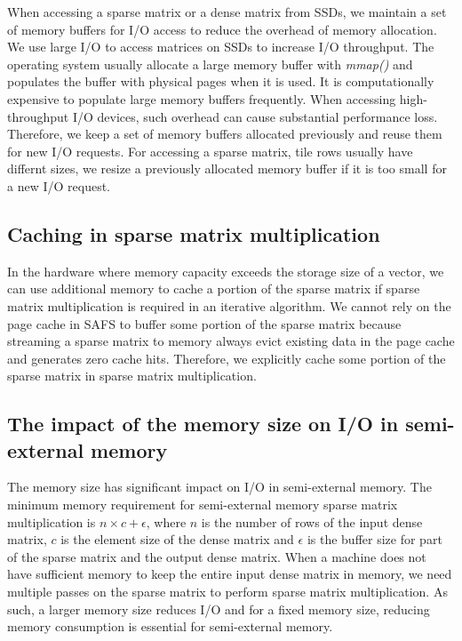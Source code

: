 When accessing a sparse matrix or a dense matrix from SSDs, we maintain a set of
memory buffers for I/O access to reduce the overhead of memory allocation.
We use large I/O to access matrices on SSDs to increase I/O throughput.
The operating system usually allocate a large memory buffer with \textit{mmap()}
and populates the buffer with physical pages when it is used. It is
computationally expensive to populate
large memory buffers frequently. When accessing high-throughput I/O devices,
such overhead can cause substantial performance loss. Therefore, we keep a set
of memory buffers allocated previously and reuse them for new I/O requests.
For accessing a sparse matrix, tile rows usually have differnt sizes, we resize
a previously allocated memory buffer if it is too small for a new I/O request.

\subsection{Caching in sparse matrix multiplication} \label{sec:cache}
In the hardware where memory capacity exceeds the storage size of a vector, we
can use additional memory to cache a portion of the sparse matrix if sparse matrix
multiplication is required in an iterative algorithm. We cannot rely on
the page cache in SAFS \cite{sa-cache} to buffer some portion of the sparse matrix
because streaming a sparse matrix to memory always evict existing data in the page
cache and generates zero cache hits. Therefore, we explicitly cache some portion
of the sparse matrix in sparse matrix multiplication. 

\subsection{The impact of the memory size on I/O in semi-external memory}
\label{sec:mem}
The memory size has significant impact on I/O in semi-external memory.
The minimum memory requirement for semi-external memory sparse matrix
multiplication is $n \times c + \epsilon$, where $n$ is the number of rows
of the input dense matrix, $c$ is the element size of the dense matrix
and $\epsilon$ is the buffer size for part of the sparse matrix and the output
dense matrix. When a machine does not have sufficient memory to keep the entire
input dense matrix in memory, we need multiple passes on the sparse matrix to
perform sparse matrix multiplication. As such, a larger memory size reduces I/O
and for a fixed memory size, reducing memory consumption is
essential for semi-external memory.


